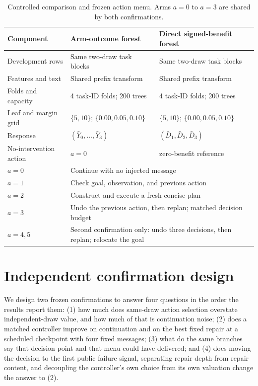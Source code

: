 \documentclass{article}
\begin{document}
\begin{table}[t]
\caption{Controlled comparison and frozen action menu. Arms $a=0$ to $a=3$ are shared by both confirmations.}
\label{tab:design}
\centering
\small
\begin{tabular}{@{}lll@{}}
\toprule
Component & Arm-outcome forest & Direct signed-benefit forest \\
\midrule
Development rows & Same two-draw task blocks & Same two-draw task blocks \\
Features and text & Shared prefix transform & Shared prefix transform \\
Folds and capacity & 4 task-ID folds; 200 trees & 4 task-ID folds; 200 trees \\
Leaf and margin grid & $\{5,10\}$; $\{0.00,0.05,0.10\}$ & $\{5,10\}$; $\{0.00,0.05,0.10\}$ \\
Response & $(\bar Y_0,\ldots,\bar Y_3)$ & $(\bar D_1,\bar D_2,\bar D_3)$ \\
No-intervention action & $a=0$ & zero-benefit reference \\
\midrule
$a=0$ & \multicolumn{2}{l}{Continue with no injected message} \\
$a=1$ & \multicolumn{2}{l}{Check goal, observation, and previous action} \\
$a=2$ & \multicolumn{2}{l}{Construct and execute a fresh concise plan} \\
$a=3$ & \multicolumn{2}{l}{Undo the previous action, then replan; matched decision budget} \\
$a=4,5$ & \multicolumn{2}{l}{Second confirmation only: undo three decisions, then replan; relocate the goal} \\
\bottomrule
\end{tabular}
\end{table}

\section{Independent confirmation design}
\label{sec:design}

We design two frozen confirmations to answer four questions in the order the results report them: (1) how much does same-draw action selection overstate independent-draw value, and how much of that is continuation noise; (2) does a matched controller improve on continuation and on the best fixed repair at a scheduled checkpoint with four fixed messages; (3) what do the same branches say that decision point and that menu could have delivered; and (4) does moving the decision to the first public failure signal, separating repair depth from repair content, and decoupling the controller's own choice from its own valuation change the answer to (2).
\end{document}
